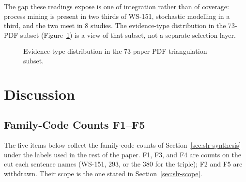 The gap these readings expose is one of integration rather than of
coverage: process mining is present in two thirds of WS-151, stochastic
modelling in a third, and the two meet in 8 studies. The evidence-type
distribution in the 73-PDF subset (Figure~\ref{fig:pdf-evidence-dist}) is
a view of that subset, not a separate selection layer.

\begin{figure}[tbp]
\centering
{}
\caption{Evidence-type distribution in the 73-paper PDF triangulation subset.}
\label{fig:pdf-evidence-dist}
\end{figure}


\section{Discussion}
\label{sec:slr-discussion}

\subsection{Family-Code Counts F1--F5}
\label{sec:slr-gaps}

The five items below collect the family-code counts of
Section~\ref{sec:slr-synthesis} under the labels used in the rest of the
paper. F1, F3, and F4 are counts on the cut each sentence names (WS-151,
293, or the 380 for the triple); F2 and F5 are withdrawn. Their scope is
the one stated in Section~\ref{sec:slr-scope}.

